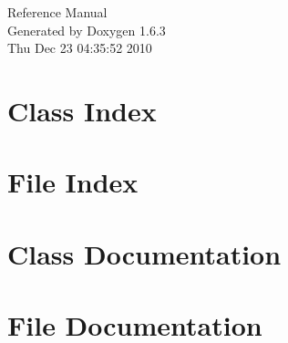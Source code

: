 \documentclass[a4paper]{book}
\begin{document}
\hypersetup{pageanchor=false}
\begin{titlepage}
\vspace*{7cm}
\begin{center}
{\Large Reference Manual}\\
\vspace*{1cm}
{\large Generated by Doxygen 1.6.3}\\
\vspace*{0.5cm}
{\small Thu Dec 23 04:35:52 2010}\\
\end{center}
\end{titlepage}
\clearemptydoublepage
{}
\tableofcontents
\clearemptydoublepage
{}
\hypersetup{pageanchor=true}
\chapter{Class Index}

\chapter{File Index}

\chapter{Class Documentation}















\chapter{File Documentation}


















\printindex
\end{document}
